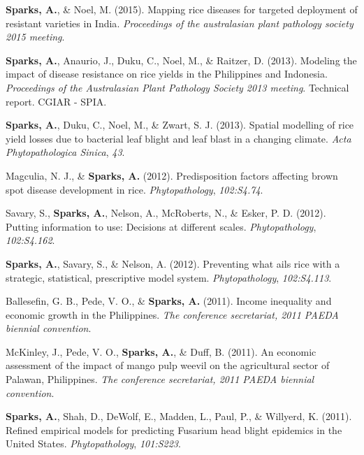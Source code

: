 \documentclass[11pt, a4paper]{awesome-cv}
\begin{document}
\leavevmode{}%
\textbf{Sparks, A.}, \& Noel, M. (2015). Mapping rice diseases for
targeted deployment of resistant varieties in {India}. \emph{Proceedings
of the australasian plant pathology society 2015 meeting}.

\leavevmode{}%
\textbf{Sparks, A.}, Anaurio, J., Duku, C., Noel, M., \& Raitzer, D.
(2013). Modeling the impact of disease resistance on rice yields in the
{Philippines} and {Indonesia}. \emph{Proceedings of the {Australasian
Plant Pathology Society} 2013 meeting}. Technical report. CGIAR - SPIA.

\leavevmode{}%
\textbf{Sparks, A.}, Duku, C., Noel, M., \& Zwart, S. J. (2013). Spatial
modelling of rice yield losses due to bacterial leaf blight and leaf
blast in a changing climate. \emph{{Acta Phytopathologica Sinica}},
\emph{43}.

\leavevmode{}%
Magculia, N. J., \& \textbf{Sparks, A.} (2012). Predisposition factors
affecting brown spot disease development in rice. \emph{Phytopathology},
\emph{102:S4.74}.

\leavevmode{}%
Savary, S., \textbf{Sparks, A.}, Nelson, A., McRoberts, N., \& Esker, P.
D. (2012). Putting information to use: {Decisions} at different scales.
\emph{Phytopathology}, \emph{102:S4.162}.

\leavevmode{}%
\textbf{Sparks, A.}, Savary, S., \& Nelson, A. (2012). Preventing what
ails rice with a strategic, statistical, prescriptive model system.
\emph{Phytopathology}, \emph{102:S4.113}.

\leavevmode{}%
Ballesefin, G. B., Pede, V. O., \& \textbf{Sparks, A.} (2011). Income
inequality and economic growth in the {Philippines}. \emph{The
conference secretariat, 2011 {PAEDA} biennial convention}.

\leavevmode{}%
McKinley, J., Pede, V. O., \textbf{Sparks, A.}, \& Duff, B. (2011). An
economic assessment of the impact of mango pulp weevil on the
agricultural sector of {Palawan, Philippines}. \emph{The conference
secretariat, 2011 {PAEDA} biennial convention}.

\leavevmode{}%
\textbf{Sparks, A.}, Shah, D., DeWolf, E., Madden, L., Paul, P., \&
Willyerd, K. (2011). Refined empirical models for predicting {Fusarium}
head blight epidemics in the {United States}. \emph{Phytopathology},
\emph{101:S223}.
\end{document}
